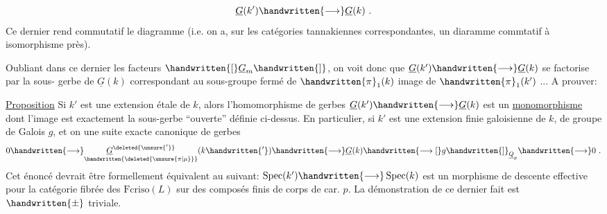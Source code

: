 
\[
\underline{G}(k')\handwritten{\longrightarrow}\underline{G}(k)\ .
\]
Ce dernier rend commutatif  le diagramme
(i.e. on a, sur les catégories tannakiennes correspondantes, un diaramme commtatif à isomorphisme  près).

Oubliant dans ce dernier les facteurs $\handwritten{[}\underline{G}_m\handwritten{]}$, on voit donc que $\underline{G}(k')\handwritten{\longrightarrow}\underline{G}(k)$ se factorise par la sous- gerbe de $\underline{G}(k)$ correspondant au sous-groupe fermé de $\handwritten{\pi}_1(k)$ image de $\handwritten{\pi}_1(k')$ ... A prouver:

\uline{Proposition}  Si $k'$ est une extension  étale de $k$, alors l'homomorphisme de gerbes $\underline{G}(k')\handwritten{\longrightarrow}\underline{G}(k)$ est un \uline{monomorphisme} dont l'image est exactement la sous-gerbe ``ouverte'' définie ci-dessus. En particulier, si $k'$ est une extension finie galoisienne de $k$,  de groupe de Galois $g$, et on une suite exacte canonique de gerbes
\[
0\handwritten{\longrightarrow}\underset{\handwritten{\deleted{\unsure{\pi|\mu}}}}{\underline{G}^{\deleted{\unsure{'}}}}(k\handwritten{'})\handwritten{\longrightarrow}\underline{G}(k)\handwritten{\longrightarrow [}g\handwritten{]}_{\underline{Q}_p}\handwritten{\longrightarrow}0\ .
\]
Cet énoncé devrait être formellement équivalent au suivant: $\operatorname{Spec}(k')\handwritten{\longrightarrow}\operatorname{Spec}(k)$ est un morphisme de descente effective pour la catégorie fibrée des $\mathrm{Fcriso}(L)$ sur des composés finis de corps de car. $p$. La démonstration de ce dernier fait est $\handwritten{\pm}$ triviale.

